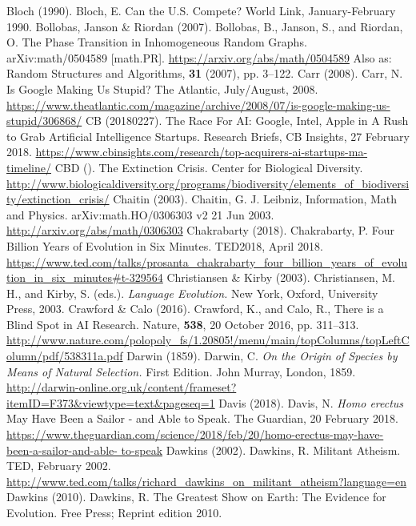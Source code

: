 \begin{multicols}{2}
\begin{thebibliography}{99}
 Bloch (1990). Bloch, E. Can the U.S. Compete? World Link, January-February 1990.
 Bollobas, Janson \& Riordan (2007). Bollobas, B., Janson, S., and Riordan, O. The Phase Transition in Inhomogeneous Random Graphs. arXiv:math/0504589 [math.PR]. \url{https://arxiv.org/abs/math/0504589} Also as: Random Structures and Algorithms, \textbf{31} (2007), pp. 3--122.
 Carr (2008). Carr, N. Is Google Making Us Stupid? The Atlantic, July/August, 2008. \url{https://www.theatlantic.com/magazine/archive/2008/07/is-google-making-us-stupid/306868/} 
 CB (20180227). The Race For AI: Google, Intel, Apple in A Rush to Grab Artificial Intelligence Startups. Research Briefs, CB Insights, 27 February 2018. \url{https://www.cbinsights.com/research/top-acquirers-ai-startups-ma-timeline/}
 CBD (). The Extinction Crisis. Center for Biological Diversity. \url{http://www.biologicaldiversity.org/programs/biodiversity/elements_of_biodiversity/extinction_crisis/}
 Chaitin (2003). Chaitin, G. J. Leibniz, Information, Math and Physics. arXiv:math.HO/0306303 v2 21 Jun 2003. \url{http://arxiv.org/abs/math/0306303}
 Chakrabarty (2018). Chakrabarty, P. Four Billion Years of Evolution in Six Minutes. TED2018, April 2018. \url{https://www.ted.com/talks/prosanta_chakrabarty_four_billion_years_of_evolution_in_six_minutes#t-329564}
 Christiansen \& Kirby (2003). Christiansen, M. H., and Kirby, S. (eds.). \textit{Language Evolution.} New York, Oxford, University Press, 2003.
 Crawford \& Calo (2016). Crawford, K., and Calo, R., There is a Blind Spot in AI Research. Nature, \textbf{538}, 20 October 2016, pp. 311--313. \url{http://www.nature.com/polopoly_fs/1.20805!/menu/main/topColumns/topLeftColumn/pdf/538311a.pdf}
 Darwin (1859). Darwin, C. \textit{On the Origin of Species by Means of Natural Selection.} First Edition. John Murray, London, 1859. \url{http://darwin-online.org.uk/content/frameset?itemID=F373&viewtype=text&pageseq=1} 
 Davis (2018). Davis, N. \textit{Homo erectus} May Have Been a Sailor - and Able to Speak. The Guardian, 20 February 2018. \url{https://www.theguardian.com/science/2018/feb/20/homo-erectus-may-have-been-a-sailor-and-able- to-speak}
 Dawkins (2002). Dawkins, R. Militant Atheism. TED, February 2002. \url{http://www.ted.com/talks/richard_dawkins_on_militant_atheism?language=en}
 Dawkins (2010). Dawkins, R. The Greatest Show on Earth: The Evidence for Evolution. Free Press; Reprint edition 2010.

\end{thebibliography}
\end{multicols}
